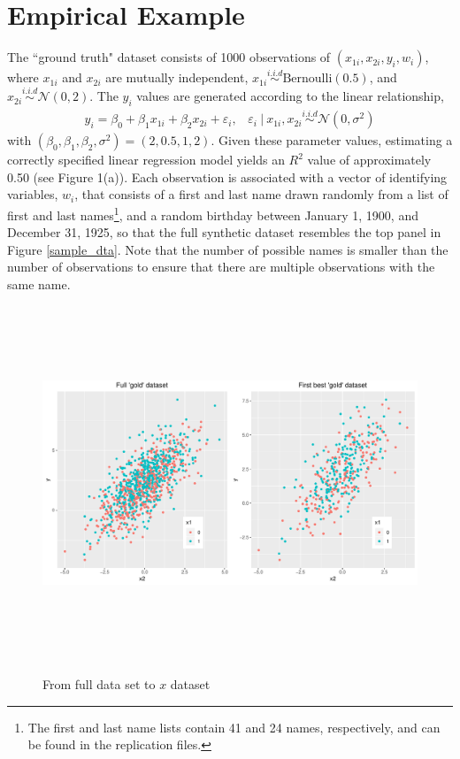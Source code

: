 \documentclass[12pt]{article}
\begin{document}
\section{Empirical Example}
The ``ground truth" dataset consists of 1000 observations of $(x_{1i}, x_{2i}, y_i, w_i)$, where $x_{1i}$ and $x_{2i}$ are mutually independent, $x_{1i} \overset{i.i.d}{\sim} \text{Bernoulli}(0.5)$, and $x_{2i} \overset{i.i.d}{\sim} \mathcal{N}(0, 2)$.  The $y_i$ values are generated according to the linear relationship,
\begin{gather}
y_i = \beta_0 + \beta_1 x_{1i} + \beta_2 x_{2i} + \varepsilon_i, \hspace{10pt} 
\varepsilon_i\  |\  x_{1i}, x_{2i} \overset{i.i.d}{\sim} \mathcal{N}(0, \sigma^2) 
\end{gather}
with $(\beta_0, \beta_1, \beta_2, \sigma^2) = (2, 0.5, 1, 2)$.  Given these parameter values, estimating a correctly specified linear regression model yields an $R^2$ value of approximately 0.50 (see Figure 1(a)).  Each observation is associated with a vector of identifying variables, $w_i$, that consists of a first and last name drawn randomly from a list of first and last names\footnote{The first and last name lists contain 41 and 24 names, respectively, and can be found in the replication files.}, and a random birthday between January 1, 1900, and December 31, 1925, so that the full synthetic dataset resembles the top panel in Figure \ref{sample_dta}.  Note that the number of possible names is smaller than the number of observations to ensure that there are multiple observations with the same name. 
 
 
 
\begin{figure}[htbp]
\begin{center}
\caption{From full data set to $x$ dataset}
\includegraphics[height = 300pt, width=\textwidth]{./Figures/gold_data_compare.pdf}
\label{default}
\end{center}
\end{figure}
\end{document}
